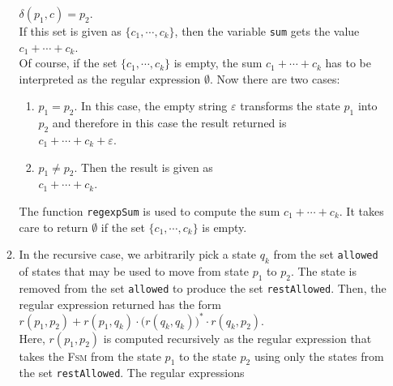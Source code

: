 \begin{enumerate}
\begin{enumerate}
            $\delta(p_1, c) = p_2$.
            \\[0.2cm]
            If this set is given as $\{c_1, \cdots, c_k\}$, then the variable \texttt{sum}
            gets the value
            \\[0.2cm]
            \hspace*{1.3cm}
            $c_1 + \cdots + c_k$.
            \\[0.2cm]
            Of course, if the set $\{c_1, \cdots, c_k\}$ is empty, the sum 
            $c_1 + \cdots + c_k$ has to be interpreted as the regular expression
            $\emptyset$.
            Now there are two cases:
            \begin{enumerate}
            \item $p_1 = p_2$.  In this case, the empty string $\varepsilon$ transforms
                  the state $p_1$ into $p_2$ and therefore in this case the result returned  is
                  \\[0.2cm]
                  \hspace*{1.3cm}
                  $c_1 + \cdots + c_k + \varepsilon$.
            \item $p_1 \not= p_2$.  Then the result is given as
                  \\[0.2cm]
                  \hspace*{1.3cm}
                  $c_1 + \cdots + c_k$.
            \end{enumerate}
            The function \texttt{regexpSum} is used to compute the sum $c_1 + \cdots +c_k$.  It
            takes care to return $\emptyset$ if the set $\{c_1, \cdots, c_k\}$ is empty.
      \item In the recursive case, we arbitrarily pick a state $q_k$ from the set
            \texttt{allowed} of states that may be used to move from state $p_1$ to $p_2$.
            The state is removed from the set \texttt{allowed} to produce the set \texttt{restAllowed}.
            Then, the regular expression returned has the form
            \\[0.2cm]
            \hspace*{1.3cm}
            $r(p_1,p_2) + r(p_1,q_k) \cdot \bigl(r(q_k,q_k)\bigr)^* \cdot r(q_k,p_2)$.
            \\[0.2cm]
            Here, $r(p_1,p_2)$ is computed recursively as the regular expression that
            takes the \textsc{Fsm} from the state $p_1$ to the state $p_2$ using only the states
            from the set \texttt{restAllowed}.  The regular expressions 

\end{enumerate}
\end{enumerate}
